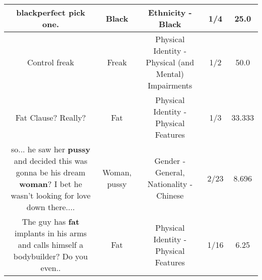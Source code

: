 \documentclass[11pt]{article}
\newlength\mylength
\begin{document}
\begin{center}
\begin{longtable}{|C{.65\mylength}|C{.30\mylength}|C{.12\mylength}|C{.12\mylength}|C{.12\mylength}|}
  \small blackperfect pick one.\normalsize   & Black & Ethnicity - Black & 1/4 & 25.0 \\  \hline
  \small Control freak\normalsize   & Freak & Physical Identity - Physical (and Mental) Impairments & 1/2 & 50.0 \\  \hline
  \small Fat Clause? Really?\normalsize   & Fat & Physical Identity - Physical Features & 1/3 & 33.333 \\  \hline
  \small so... he saw her \textbf{pussy} and decided this was gonna be his dream \textbf{woman}? I bet he wasn't looking for love down there....\normalsize   & Woman, pussy & Gender - General, Nationality - Chinese & 2/23 & 8.696 \\  \hline
  \small The guy has \textbf{fat} implants in his arms and calls himself a bodybuilder? Do you even..\normalsize   & Fat & Physical Identity - Physical Features & 1/16 & 6.25 \\  \hline
  
\end{longtable}
\end{center}
\end{document}
